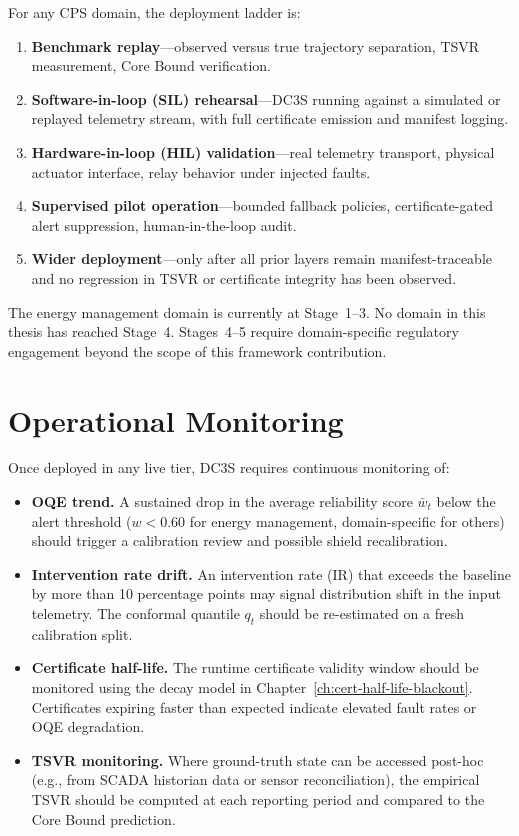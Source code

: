 For any CPS domain, the deployment ladder is:

\begin{enumerate}
  \item \textbf{Benchmark replay}---observed versus true trajectory separation,
    TSVR measurement, Core Bound verification.
  \item \textbf{Software-in-loop (SIL) rehearsal}---DC3S running against a
    simulated or replayed telemetry stream, with full certificate emission
    and manifest logging.
  \item \textbf{Hardware-in-loop (HIL) validation}---real telemetry transport,
    physical actuator interface, relay behavior under injected faults.
  \item \textbf{Supervised pilot operation}---bounded fallback policies,
    certificate-gated alert suppression, human-in-the-loop audit.
  \item \textbf{Wider deployment}---only after all prior layers remain
    manifest-traceable and no regression in TSVR or certificate integrity
    has been observed.
\end{enumerate}

The energy management domain is currently at Stage~1--3.  No domain in
this thesis has reached Stage~4.  Stages~4--5 require domain-specific
regulatory engagement beyond the scope of this framework contribution.

\section{Operational Monitoring}

Once deployed in any live tier, DC3S requires continuous monitoring of:

\begin{itemize}
  \item \textbf{OQE trend.}  A sustained drop in the average reliability
    score $\bar{w}_t$ below the alert threshold ($w < 0.60$ for energy
    management, domain-specific for others) should trigger a calibration
    review and possible shield recalibration.

  \item \textbf{Intervention rate drift.}  An intervention rate (IR) that
    exceeds the baseline by more than 10 percentage points may signal
    distribution shift in the input telemetry.  The conformal quantile
    $q_t$ should be re-estimated on a fresh calibration split.

  \item \textbf{Certificate half-life.}  The runtime certificate validity
    window should be monitored using the decay model in
    Chapter~\ref{ch:cert-half-life-blackout}.  Certificates expiring faster
    than expected indicate elevated fault rates or OQE degradation.

  \item \textbf{TSVR monitoring.}  Where ground-truth state can be accessed
    post-hoc (e.g., from SCADA historian data or sensor reconciliation),
    the empirical TSVR should be computed at each reporting period and
    compared to the Core Bound prediction.
\end{itemize}

